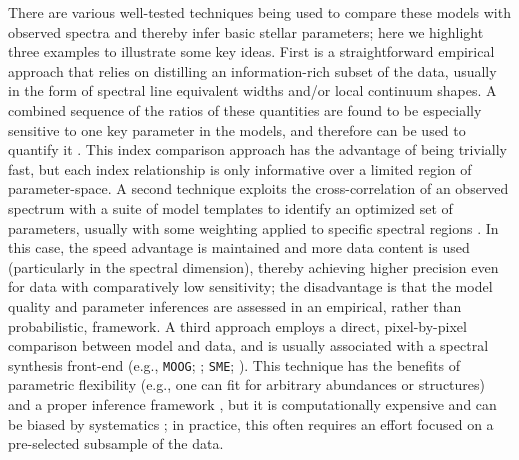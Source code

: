\documentclass[iop,floatfix]{emulateapj}
\begin{document}
There are various well-tested techniques being used to compare these models with observed spectra 
and thereby infer basic stellar parameters; here we highlight three examples to illustrate some key 
ideas.  First is a straightforward empirical approach that relies on distilling an information-rich 
subset of the data, usually in the form of spectral line equivalent widths and/or local continuum 
shapes.  A combined sequence of the ratios of these quantities are found to be especially sensitive 
to one key parameter in the models, and therefore can be used to quantify it 
\citep[e.g.,][]{gray94,reid95,rojas-ayala10,rojas-ayala12}.  This index comparison approach has 
the advantage of being trivially fast, but each index relationship is only informative over a 
limited region of parameter-space.  A second technique exploits the cross-correlation of an 
observed spectrum with a suite of model templates to identify an optimized set of parameters, 
usually with some weighting applied to specific spectral regions \citep[e.g., {\tt 
SPC};][]{buchhave12}.  In this case, the speed advantage is maintained and more data content is 
used (particularly in the spectral dimension), thereby achieving higher precision even for data 
with comparatively low sensitivity; the disadvantage is that the model quality and parameter 
inferences are assessed in an empirical, rather than probabilistic, framework.  A third approach 
employs a direct, pixel-by-pixel comparison between model and data, and is usually associated with 
a spectral synthesis front-end (e.g., {\tt MOOG}; \citealt{sneden73}; {\tt SME}; 
\citealt{valenti96}).  This technique has the benefits of parametric flexibility (e.g., one can fit 
for arbitrary abundances or structures) and a proper inference framework \citep[usually a 
least-squares approach, although increasingly in a Bayesian format;][]{shkedy07,schoenrich13}, but 
it is computationally expensive and can be biased by systematics \citep[e.g.,][]{mann13}; in 
practice, this often requires an effort focused on a pre-selected subsample of the data. 
\end{document}
